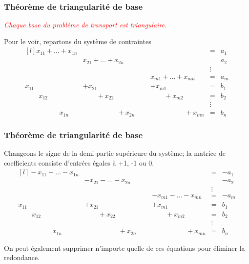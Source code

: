 \documentclass[usepdftitle=false]{beamer}
\begin{document}
\begin{frame}
\frametitle{Théorème de triangularité de base}

\textcolor{red}{\sl Chaque base du problème de transport est triangulaire.}

\mbox{}

Pour le voir, repartons du système de contraintes
\[
\begin{matrix}[l]
x_{11} + \ldots + x_{1n} & & & & = & a_1 \\
& x_{21} + \ldots + x_{2n} & & & = &  a_2 \\
& & & & \vdots \\
& & \mbox{ } & x_{m1} + \ldots + x_{mn} & = &  a_m \\
x_{11} & + x_{21} & & + x_{m1} & = & b_1 \\
\quad \quad x_{12} & \quad \quad + x_{22} & & \quad \quad + x_{m2} & = & b_2 \\
& & & & \vdots \\
\quad \quad \quad \qquad x_{1n} &  \quad \quad \quad \qquad +x_{2n} & &  \quad \quad \quad \qquad +x_{mn} & = & b_n 
\end{matrix}
\]

\end{frame}

\begin{frame}
\frametitle{Théorème de triangularité de base}

Changeons le signe de la demi-partie supérieure du système; la matrice de coefficients consiste d'entrées égales à +1, -1 ou 0.
\[
\begin{matrix}[l]
-x_{11} - \ldots - x_{1n} & & & & = & -a_1 \\
& -x_{21} - \ldots - x_{2n} & & & = &  -a_2 \\
& & & & \vdots \\
& & \mbox{ } & - x_{m1} - \ldots - x_{mn} & = &  -a_m \\
x_{11} & + x_{21} & & + x_{m1} & = & b_1 \\
\quad \quad x_{12} & \quad \quad + x_{22} & & \quad \quad + x_{m2} & = & b_2 \\
& & & & \vdots \\
\quad \quad \quad \qquad x_{1n} &  \quad \quad \quad \qquad +x_{2n} & &  \quad \quad \quad \qquad +x_{mn} & = & b_n 
\end{matrix}
\]

On peut également supprimer n'importe quelle de ces équations pour éliminer la redondance.

\end{frame}
\end{document}
